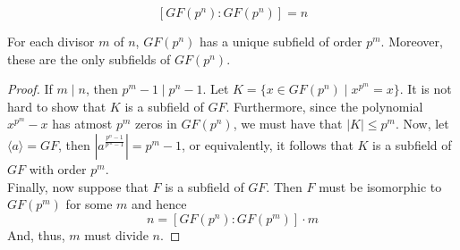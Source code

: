 \begin{corollary}
	$$[GF(p^n):GF(p^n)]=n$$
\end{corollary}

\begin{proposition}
	For each divisor $m$ of $n$, $GF(p^n)$ has a unique subfield of order $p^m$. Moreover, these are the only subfields of $GF(p^n)$.
\end{proposition}
\begin{proof}
	If $m\mid n$, then $p^m-1\mid p^n-1$. Let $K=\{x\in GF(p^n)\mid x^{p^m}=x\}$. It is not hard to show that $K$ is a subfield of $GF$. Furthermore, since the polynomial $x^{p^m}-x$ has atmost $p^m$ zeros in $GF(p^n)$, we must have that $|K|\le p^m$. Now, let $\langle a\rangle = GF$, then $|a^{\frac{p^n-1}{p^m-1}}|=p^m-1$, or equivalently, it follows that $K$ is a subfield of $GF$ with order $p^m$.\\
	Finally, now suppose that $F$ is a subfield of $GF$. Then $F$ must be isomorphic to $GF(p^m)$ for some $m$ and hence 
	\begin{equation*}
		n = [GF(p^n):GF(p^m)]\cdot m
	\end{equation*}
	And, thus, $m$ must divide $n$. 
\end{proof}


